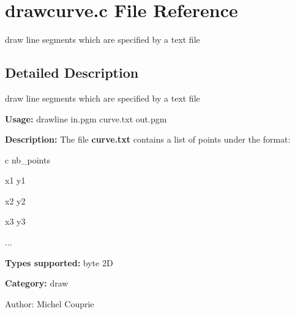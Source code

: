 \section{drawcurve.c File Reference}
\label{drawcurve_8c}
draw line segments which are specified by a text file 



\subsection{Detailed Description}
draw line segments which are specified by a text file 

{\bf Usage:} drawline in.pgm curve.txt out.pgm

{\bf Description:} The file {\bf curve.txt} contains a list of points under the format:\par
 c nb\_\-points\par
 x1 y1\par
 x2 y2\par
 x3 y3\par
 ...\par


{\bf Types supported:} byte 2D

{\bf Category:} draw

\begin{Desc}
\item[Author:]Michel Couprie \end{Desc}
